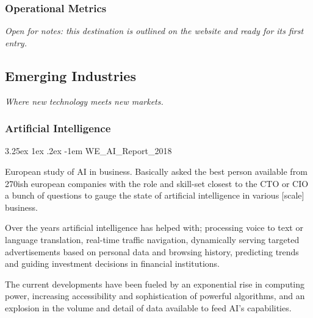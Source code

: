 \documentclass{article}
\makeatletter
\newcounter{subsubsubsection}[subsubsection]
\renewcommand\subparagraph{\@startsection{subparagraph}{6}{\parindent}%
  {3.25ex \@plus1ex \@minus .2ex}%
  {-1em}%
  {\normalfont\normalsize\bfseries}}
\makeatother
\begin{document}
\subsubsection{Operational Metrics}\label{sec:operational-metrics}
\textit{Open for notes: this destination is outlined on the website and ready for its first entry.}

\subsection{Emerging Industries}\label{sec:emerging-industries}
\textit{Where new technology meets new markets.}

\subsubsection{Artificial Intelligence}\label{sec:emerging-industries-artificial-intelligence}

\newpage 

\subparagraph{WE\_AI\_Report\_2018}
\vspace{0.45cm}

European study of AI in business. Basically asked the best person available from 270ish european companies with the role and skill-set closest to the CTO or CIO a bunch of questions to gauge the state of artificial intelligence in various [scale] business. 

\vspace{0.2cm}

\hspace{-0.675cm} Over the years artificial intelligence has helped with; processing voice to text or language translation, real-time traffic navigation, dynamically serving targeted advertisements based on personal data and browsing history, predicting trends and guiding investment decisions in financial institutions. 

\vspace{0.2cm}

\hspace{-0.675cm} The current developments have been fueled by an exponential rise in computing power, increasing accessibility and sophistication of powerful algorithms, and an explosion in the volume and detail of data available to feed AI’s capabilities. 
\end{document}
